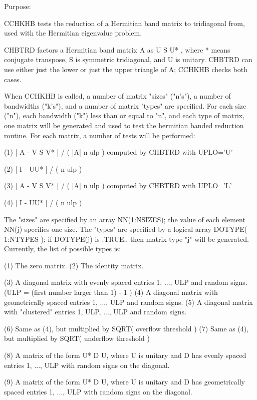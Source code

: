 \begin{DoxyParagraph}{Purpose\+: }
\begin{DoxyVerb} CCHKHB tests the reduction of a Hermitian band matrix to tridiagonal
 from, used with the Hermitian eigenvalue problem.

 CHBTRD factors a Hermitian band matrix A as  U S U* , where * means
 conjugate transpose, S is symmetric tridiagonal, and U is unitary.
 CHBTRD can use either just the lower or just the upper triangle
 of A; CCHKHB checks both cases.

 When CCHKHB is called, a number of matrix "sizes" ("n's"), a number
 of bandwidths ("k's"), and a number of matrix "types" are
 specified.  For each size ("n"), each bandwidth ("k") less than or
 equal to "n", and each type of matrix, one matrix will be generated
 and used to test the hermitian banded reduction routine.  For each
 matrix, a number of tests will be performed:

 (1)     | A - V S V* | / ( |A| n ulp )  computed by CHBTRD with
                                         UPLO='U'

 (2)     | I - UU* | / ( n ulp )

 (3)     | A - V S V* | / ( |A| n ulp )  computed by CHBTRD with
                                         UPLO='L'

 (4)     | I - UU* | / ( n ulp )

 The "sizes" are specified by an array NN(1:NSIZES); the value of
 each element NN(j) specifies one size.
 The "types" are specified by a logical array DOTYPE( 1:NTYPES );
 if DOTYPE(j) is .TRUE., then matrix type "j" will be generated.
 Currently, the list of possible types is:

 (1)  The zero matrix.
 (2)  The identity matrix.

 (3)  A diagonal matrix with evenly spaced entries
      1, ..., ULP  and random signs.
      (ULP = (first number larger than 1) - 1 )
 (4)  A diagonal matrix with geometrically spaced entries
      1, ..., ULP  and random signs.
 (5)  A diagonal matrix with "clustered" entries 1, ULP, ..., ULP
      and random signs.

 (6)  Same as (4), but multiplied by SQRT( overflow threshold )
 (7)  Same as (4), but multiplied by SQRT( underflow threshold )

 (8)  A matrix of the form  U* D U, where U is unitary and
      D has evenly spaced entries 1, ..., ULP with random signs
      on the diagonal.

 (9)  A matrix of the form  U* D U, where U is unitary and
      D has geometrically spaced entries 1, ..., ULP with random
      signs on the diagonal.


\end{DoxyVerb}
\end{DoxyParagraph}
